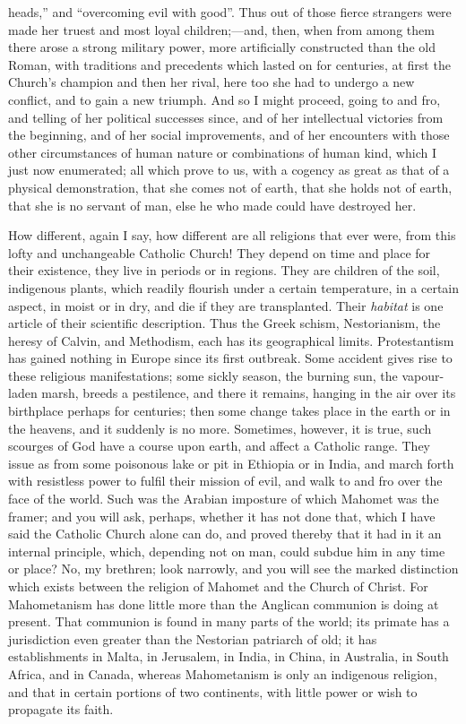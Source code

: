heads,'' and ``overcoming evil with good''. Thus out of
those fierce strangers were made her truest and most loyal children;—and,
then, when from among them there arose a strong military power, more
artificially constructed than the old Roman, with traditions and
precedents which lasted on for centuries, at first the Church's
champion and then her rival, here too she had to undergo a new
conflict, and to gain a new triumph. And so I might proceed, going to
and fro, and telling of her political successes since, and of her
intellectual victories from the beginning, and of her social
improvements, and of her encounters with those other circumstances of
human nature or combinations of human kind, which I just now
enumerated; all which prove to us, with a cogency as great as that of
a physical demonstration, that she comes not of earth, that she holds
not of earth, that she is no servant of man, else he who made could
have destroyed her.

How different, again I say, how different are all religions that
ever were, from this lofty and unchangeable Catholic Church! They
depend on time and place for their existence, they live in periods or
in regions. They are children of the soil, indigenous plants, which
readily flourish under a certain temperature, in a certain aspect, in
moist or in dry, and die if they are transplanted. Their \emph{habitat}
is one article of their scientific description. Thus the Greek schism,
Nestorianism, the heresy of Calvin, and Methodism, each has its
geographical limits. Protestantism has gained nothing in Europe since
its first outbreak. Some accident gives rise to these religious
manifestations; some sickly season, the burning sun, the vapour-laden
marsh, breeds a pestilence, and there it remains, hanging in the air
over its birthplace perhaps for centuries; then some change takes
place in the earth or in the heavens, and it suddenly is no more.
Sometimes, however, it is true, such scourges of God have a course
upon earth, and affect a Catholic range. They issue as from some
poisonous lake or pit in Ethiopia or in India, and march forth with
resistless power to fulfil their mission of evil, and walk to and fro
over the face of the world. Such was the Arabian imposture of which
Mahomet was the framer; and you will ask, perhaps, whether it has not
done that, which I have said the Catholic Church alone can do, and
proved thereby that it had in it an internal principle, which,
depending not on man, could subdue him in any time or place? No, my
brethren; look narrowly, and you will see the marked distinction which
exists between the religion of Mahomet and the Church of Christ. For
Mahometanism has done little more than the Anglican communion is doing
at present. That communion is found in many parts of the world; its
primate has a jurisdiction even greater than the Nestorian patriarch
of old; it has establishments in Malta, in Jerusalem, in India, in
China, in Australia, in South Africa, and in Canada, whereas
Mahometanism is only an indigenous religion, and that in certain
portions of two continents, with little power or wish to propagate its
faith.

